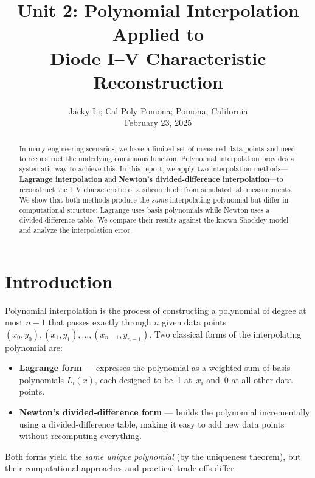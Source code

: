 \documentclass[letterpaper,twocolumn,fleqn]{article}
\title{Unit 2: Polynomial Interpolation Applied to\\
  Diode I--V Characteristic Reconstruction }
\author{ Jacky Li; Cal Poly Pomona; Pomona, California \\ February 23, 2025}
\begin{document}
 
\maketitle 
\thispagestyle{empty} %


\begin{abstract}
In many engineering scenarios, we have a limited set of measured data points and
need to reconstruct the underlying continuous function.  Polynomial
interpolation provides a systematic way to achieve this.  In this report, we
apply two interpolation methods---\textbf{Lagrange interpolation} and
\textbf{Newton's divided-difference interpolation}---to reconstruct the I--V
characteristic of a silicon diode from simulated lab measurements.  We show that
both methods produce the \emph{same} interpolating polynomial but differ in
computational structure: Lagrange uses basis polynomials while Newton uses a
divided-difference table.  We compare their results against the known Shockley
model and analyze the interpolation error.
\end{abstract}


\section{Introduction}

Polynomial interpolation is the process of constructing a polynomial of degree
at most $n-1$ that passes exactly through $n$ given data points
$(x_0, y_0), (x_1, y_1), \ldots, (x_{n-1}, y_{n-1})$.  Two classical forms of
the interpolating polynomial are:

\begin{itemize}
  \item \textbf{Lagrange form} --- expresses the polynomial as a weighted sum of
        basis polynomials $L_i(x)$, each designed to be~1 at~$x_i$ and~0 at all
        other data points.
  \item \textbf{Newton's divided-difference form} --- builds the polynomial
        incrementally using a divided-difference table, making it easy to add
        new data points without recomputing everything.
\end{itemize}

Both forms yield the \emph{same unique polynomial} (by the uniqueness theorem),
but their computational approaches and practical trade-offs differ.
\end{document}
